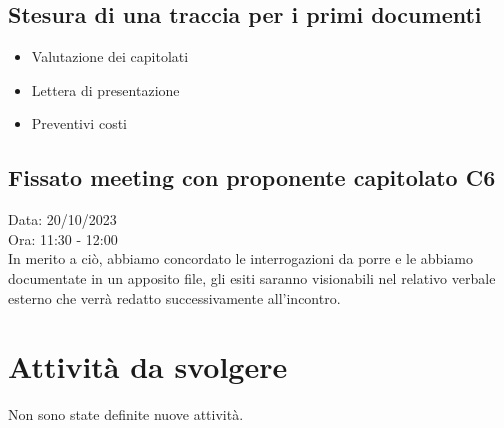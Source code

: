 \documentclass{article}
\begin{document}
        \subsection{Stesura di una traccia per i primi documenti}
            \begin{itemize}
                \item Valutazione dei capitolati
                \item Lettera di presentazione
                \item Preventivi costi
            \end{itemize}

    \subsection{Fissato meeting con proponente capitolato C6}
        Data: 20/10/2023 \\
        Ora: 11:30 - 12:00 \\
        In merito a ciò, abbiamo concordato le interrogazioni da porre e le abbiamo documentate in un apposito file, gli esiti saranno visionabili nel relativo verbale esterno che verrà redatto successivamente all'incontro.

\section{Attività da svolgere}
    Non sono state definite nuove attività.
\end{document}
